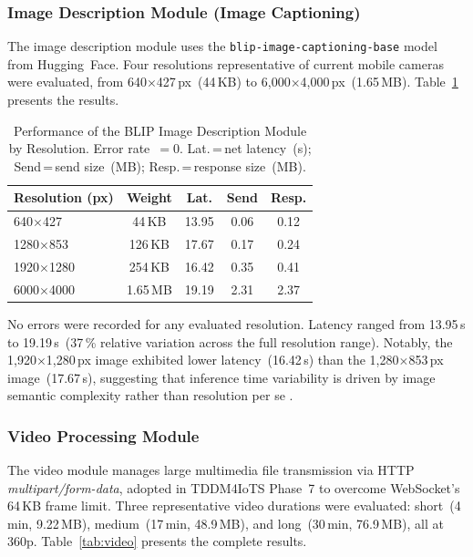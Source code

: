 \documentclass[journal]{IEEEtran}
\begin{document}
	\subsubsection{Image Description Module (Image Captioning)}
	The image description module uses the
	\texttt{blip-image-captioning-base} model from Hugging~Face.
	Four resolutions representative of current mobile cameras were
	evaluated, from 640$\times$427\,px~(44\,KB) to
	6{,}000$\times$4{,}000\,px~(1.65\,MB).
	Table~\ref{tab:img} presents the results.
	
	\begin{table}[!t]
		\caption{Performance of the BLIP Image Description Module by Resolution.
			Error rate~$=0$. Lat.\,=\,net latency~(s); Send\,=\,send size~(MB);
			Resp.\,=\,response size~(MB).}
		\label{tab:img}
		\centering
		\scriptsize
		\renewcommand{\arraystretch}{1.25}
		\begin{tabular}{p{1.9cm}cccc}
			\toprule
			\textbf{Resolution (px)} & \textbf{Weight} & \textbf{Lat.} & \textbf{Send} & \textbf{Resp.} \\
			\midrule
			640$\times$427   & 44\,KB   & 13.95 & 0.06 & 0.12 \\
			1280$\times$853  & 126\,KB  & 17.67 & 0.17 & 0.24 \\
			1920$\times$1280 & 254\,KB  & 16.42 & 0.35 & 0.41 \\
			6000$\times$4000 & 1.65\,MB & 19.19 & 2.31 & 2.37 \\
			\bottomrule
		\end{tabular}
	\end{table}
	
	No errors were recorded for any evaluated resolution.
	Latency ranged from 13.95\,s to 19.19\,s~(37\,\% relative
	variation across the full resolution range).
	Notably, the 1{,}920$\times$1{,}280\,px image exhibited lower
	latency~(16.42\,s) than the 1{,}280$\times$853\,px
	image~(17.67\,s), suggesting that inference time variability
	is driven by image semantic complexity rather than resolution
	per se \cite{dognin2021,safiya2024}.
	
	\subsubsection{Video Processing Module}
	The video module manages large multimedia file transmission
	via HTTP \textit{multipart/form-data}, adopted in TDDM4IoTS
	Phase~7 to overcome WebSocket's 64\,KB frame limit.
	Three representative video durations were evaluated: short~(4\,min,
	9.22\,MB), medium~(17\,min, 48.9\,MB), and long~(30\,min,
	76.9\,MB), all at 360p.
	Table~\ref{tab:video} presents the complete results.
	
\end{document}
